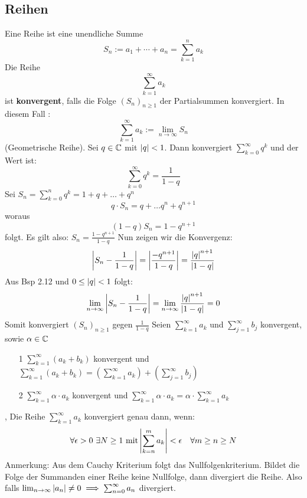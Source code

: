 \subsection{Reihen}
\Def[2.7.0] Eine Reihe ist eine unendliche Summe
\[S_{n} := a_{1}  + \cdots + a_{n} = \sum_{k=1}^{n} a_{k}\]
\Def[2.37] Die Reihe \[\sum_{k=1}^{\infty} a_{k}\] ist \textbf{konvergent}, falls die Folge \((S_n)_{n \geq 1}\) der Partialsummen konvergiert. In diesem Fall : \[\sum_{k=1}^{\infty} a_{k} := \lim\limits_{n \rightarrow \infty} S_n\]
\Bsp[2.38](Geometrische Reihe). Sei \( q \in \mathbb{C} \) mit \( \left\lvert q \right\rvert < 1\). Dann konvergiert \( \sum_{k=0}^{\infty} q^k \) und der Wert ist:
\[ \sum_{k=0}^{\infty} q^k = \frac{1}{1-q}\]
Sei \( S_n = \sum_{k=0}^n q^k = 1 + q + \dots + q^n\)
\[ q \cdot S_n = q + \dots q^n + q^{n+1}\]
woraus
\[(1-q)S_n = 1 - q^{n+1}\]
folgt. Es gilt also: \( S_n = \frac{1 - q^{n+1}}{1 - q}\) \newline
Nun zeigen wir die Konvergenz:
\[ \left\lvert S_n - \frac{1}{1-q} \right\rvert = \left\lvert \frac{-q^{n+1}}{1-q} \right\rvert= \frac{\left\lvert q \right\rvert^{n+1}}{\left\lvert 1-q \right\rvert}\]
Aus Bsp 2.12 und \( 0 \leq \left\lvert q \right\rvert < 1\) folgt:
\[ \lim_{n \rightarrow \infty} \left\lvert S_n-\frac{1}{1-q} \right\rvert = \lim_{n \rightarrow \infty} \frac{\left\lvert q \right\rvert^{n+1}}{\left\lvert 1-q \right\rvert} =0\]
Somit konvergiert \( (S_n)_{n \geq 1} \) gegen \( \frac{1}{1-q}\)
\Satz[2.40] Seien \(\sum_{k=1}^{\infty} a_{k}\) und \(\sum_{j=1}^{\infty} b_{j}\) konvergent, sowie \(\alpha \in \mathbb{C} \)
\begin{enumerate}
    \item [1] \(\sum_{k=1}^{\infty} (a_k + b_k)\) konvergent und \newline \(\sum_{k=1}^{\infty} (a_k + b_k) = (\sum_{k=1}^{\infty} a_{k}) + (\sum_{j=1}^{\infty} b_{j})\)
    \item [2] \(\sum_{k=1}^{\infty} \alpha \cdot a_k\) konvergent und \newline \(\sum_{k=1}^{\infty} \alpha \cdot a_k = \alpha \cdot \sum_{k=1}^{\infty}  a_k\)
\end{enumerate}
\sep
{}  \newline Die Reihe \(\sum_{k=1}^{\infty} a_k \) konvergiert genau dann, wenn:
\[ \forall \epsilon > 0 \ \exists N \geq 1 \ \text{mit} \left\lvert \sum_{k=n}^{m} a_k \right\rvert < \epsilon \quad \forall m \geq n \geq N\]
Anmerkung: Aus dem Cauchy Kriterium folgt das Nullfolgenkriterium.
Bildet die Folge der Summanden einer Reihe keine Nullfolge, dann divergiert die Reihe.
Also falls \( \lim_{n \rightarrow \infty} \left\lvert a_n \right\rvert \neq 0 \implies \sum_{n=0}^\infty a_n \) divergiert. \newline
